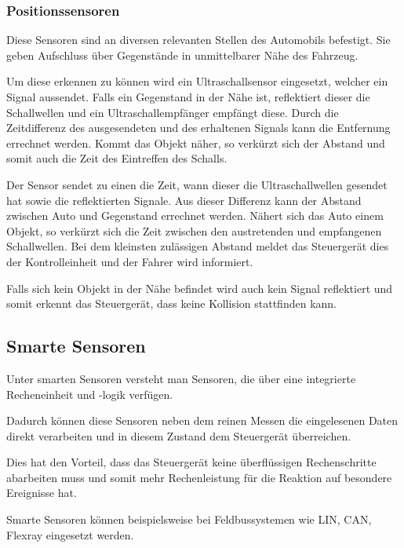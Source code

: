 	             
	             \subsubsection{Positionssensoren}
	
	                 Diese Sensoren sind an diversen relevanten Stellen des Automobils befestigt. Sie geben Aufschluss über Gegenstände in unmittelbarer Nähe des Fahrzeug.
	
	                 Um diese erkennen zu können wird ein Ultraschallsensor eingesetzt, welcher ein Signal aussendet. Falls ein Gegenstand in der Nähe ist, reflektiert dieser die Schallwellen und ein Ultraschallempfänger empfängt diese. 
	                 Durch die Zeitdifferenz des ausgesendeten und des erhaltenen Signals kann die Entfernung errechnet werden. Kommt das Objekt näher, so verkürzt sich der Abstand und somit auch die Zeit des Eintreffen des Schalls.
	
	                 Der Sensor sendet zu einen die Zeit, wann dieser die Ultraschallwellen gesendet hat sowie die reflektierten Signale. Aus dieser Differenz kann  der Abstand zwischen Auto und Gegenstand errechnet werden. 
	                 Nähert sich das Auto einem Objekt, so verkürzt sich die Zeit zwischen den austretenden und empfangenen Schallwellen. Bei dem kleinsten zulässigen Abstand meldet das Steuergerät dies der Kontrolleinheit und der Fahrer wird informiert.
	
	                 Falls sich kein Objekt in der Nähe befindet wird auch kein Signal reflektiert und somit erkennt das Steuergerät, dass keine Kollision stattfinden kann.
	
	                \subsection{Smarte Sensoren} 
	                 Unter smarten Sensoren versteht man Sensoren, die über eine integrierte Recheneinheit und -logik verfügen.
	                 
	                 Dadurch können diese Sensoren neben dem reinen Messen die eingelesenen Daten direkt verarbeiten und in diesem Zustand dem Steuergerät überreichen. 
	                 
	                 Dies hat den Vorteil, dass das Steuergerät keine überflüssigen Rechenschritte abarbeiten muss und somit mehr Rechenleistung für die Reaktion auf besondere Ereignisse hat.
	
	                 Smarte Sensoren können beispielsweise bei Feldbussystemen wie LIN, CAN, Flexray eingesetzt werden.		
	             	             
